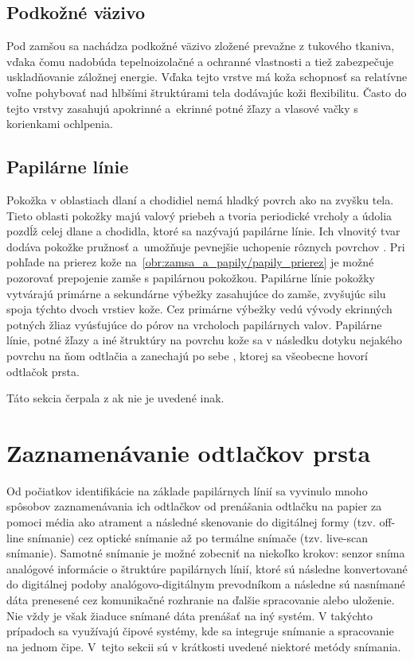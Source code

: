   \subsection{Podkožné väzivo}
  Pod zamšou sa nachádza podkožné väzivo zložené prevažne z tukového tkaniva, vďaka čomu nadobúda tepelnoizolačné a ochranné vlastnosti a tiež zabezpečuje
  uskladňovanie záložnej energie. Vďaka tejto vrstve má koža schopnosť sa relatívne voľne pohybovať nad hlbšími štruktúrami tela dodávajúc koži flexibilitu.
  Často do tejto vrstvy zasahujú apokrinné a~ekrinné potné žľazy a vlasové vačky s korienkami ochlpenia.

  \subsection{Papilárne línie}
  Pokožka v oblastiach dlaní a chodidiel nemá hladký povrch ako na zvyšku tela. Tieto oblasti pokožky majú valový priebeh a tvoria periodické vrcholy
  a údolia pozdĺž celej dlane a chodidla, ktoré sa nazývajú papilárne línie. Ich vlnovitý tvar dodáva pokožke pružnosť a~umožňuje pevnejšie
  uchopenie rôznych povrchov \cite{FingerprintSrcBook}.
  Pri pohľade na prierez kože na~{\ref{obr:zamsa_a_papily/papily_prierez}} je možné pozorovať prepojenie zamše s papilárnou pokožkou.
  Papilárne línie pokožky vytvárajú primárne a sekundárne výbežky zasahujúce do zamše, zvyšujúc silu spoja týchto dvoch vrstiev kože. Cez primárne výbežky
  vedú vývody ekrinných potných žliaz vyúsťujúce do pórov na vrcholoch papilárnych valov. Papilárne línie, potné žľazy
  a iné štruktúry na povrchu kože sa v následku dotyku nejakého povrchu na ňom odtlačia a zanechajú po sebe , 
  ktorej sa všeobecne hovorí odtlačok prsta.

  Táto sekcia čerpala z \cite{freinkel2001skin} ak nie je uvedené inak.

  \section{Zaznamenávanie odtlačkov prsta}
  Od počiatkov identifikácie na základe papilárnych línií sa vyvinulo mnoho spôsobov zaznamenávania ich odtlačkov od prenášania odtlačku na papier
  za pomoci média ako atrament a následné skenovanie do digitálnej formy (tzv. off-line snímanie) cez optické snímanie až po termálne snímače
  (tzv. live-scan snímanie). Samotné snímanie je možné zobecniť na niekoľko krokov: senzor sníma analógové informácie o štruktúre papilárnych línií,
  ktoré sú následne konvertované do digitálnej podoby analógovo-digitálnym prevodníkom a následne sú nasnímané dáta prenesené cez komunikačné rozhranie
  na ďalšie spracovanie alebo uloženie. Nie vždy je však žiaduce snímané dáta prenášať na iný systém. V takýchto prípadoch sa využívajú čipové systémy,
  kde sa integruje snímanie a spracovanie na jednom čipe.
  V~tejto sekcii sú v krátkosti uvedené niektoré metódy snímania.


